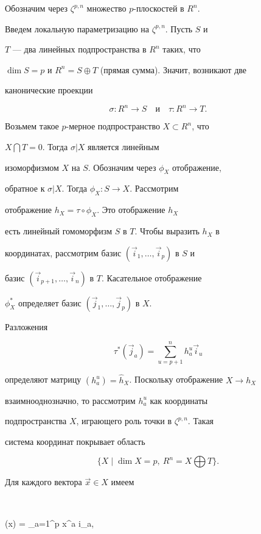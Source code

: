 Обозначим через $\zeta^{p,n}$ множество $p$-плоскостей в $R^n$.


Введем локальную параметризацию на $\zeta^{p,n}$. Пусть $S$ и


$T$ --- два линейных подпространства в $R^n$ таких, что


$\dim S = p$ и $R^n = S\oplus T$ (прямая сумма). Значит, возникают две


канонические проекции


$$


\sigma: R^n \to S\quad \text{и}\quad \tau: R^n \to T.


$$


Возьмем такое $p$-мерное подпространство $X \subset R^n$, что


$X \bigcap T = 0$. Тогда $\sigma|X$ является линейным


изоморфизмом $X$ на $S$. Обозначим через $\phi_X$ отображение,


обратное к $\sigma|X$. Тогда $\phi_X: S \to X$. Рассмотрим


отображение $h_X = \tau \circ \phi_X$. Это отображение $h_X$


есть линейный гомоморфизм $S$ в $T$. Чтобы выразить $h_X$ в


координатах, рассмотрим базис $(\Vec i_1,\dotsc,\Vec i_p)$ в $S$ и


базис $(\Vec i_{p+1},\dotsc,\Vec i_n)$ в $T$. Касательное отображение


$\phi_X^*$ определяет базис $(\Vec j_1,\dotsc,\Vec j_p)$ в $X$.


Разложения


$$


\tau^* (\Vec j_a) = \sum_{u=p+1}^n h^u_a \vec i_u


$$


определяют матрицу $(h^u_a) = {\hat h}_X$. Поскольку отображение $X \to h_X$


взаимнооднозначно, то рассмотрим $h^u_a$ как координаты


подпространства $X$, играющего роль точки в $\zeta^{p,n}$. Такая


система координат покрывает область


$$


\{ X \mid \dim X = p,\ R^n = X \bigoplus T \}.


$$


Для каждого вектора $\Vec x \in X$ имеем


$$


\sigma (\Vec x) = \sum_{a=1}^p x^a \Vec i_a,\quad


